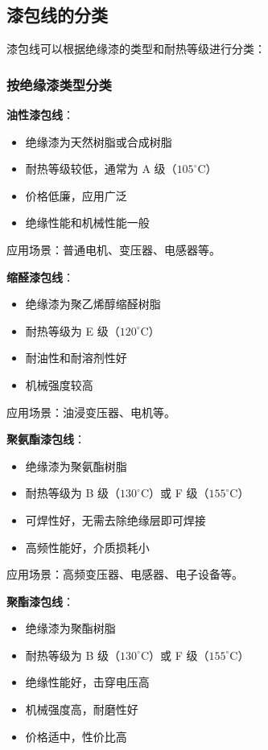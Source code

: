 \documentclass[12pt,UTF8]{ctexbook}
\begin{document}
\subsection{漆包线的分类}

漆包线可以根据绝缘漆的类型和耐热等级进行分类：

\subsubsection{按绝缘漆类型分类}

\textbf{油性漆包线}：
\begin{itemize}[leftmargin=3.5em]
    \item 绝缘漆为天然树脂或合成树脂
    \item 耐热等级较低，通常为 A 级（$105^\circ$C）
    \item 价格低廉，应用广泛
    \item 绝缘性能和机械性能一般
\end{itemize}

应用场景：普通电机、变压器、电感器等。

\textbf{缩醛漆包线}：
\begin{itemize}[leftmargin=3.5em]
    \item 绝缘漆为聚乙烯醇缩醛树脂
    \item 耐热等级为 E 级（$120^\circ$C）
    \item 耐油性和耐溶剂性好
    \item 机械强度较高
\end{itemize}

应用场景：油浸变压器、电机等。

\textbf{聚氨酯漆包线}：
\begin{itemize}[leftmargin=3.5em]
    \item 绝缘漆为聚氨酯树脂
    \item 耐热等级为 B 级（$130^\circ$C）或 F 级（$155^\circ$C）
    \item 可焊性好，无需去除绝缘层即可焊接
    \item 高频性能好，介质损耗小
\end{itemize}

应用场景：高频变压器、电感器、电子设备等。

\textbf{聚酯漆包线}：
\begin{itemize}[leftmargin=3.5em]
    \item 绝缘漆为聚酯树脂
    \item 耐热等级为 B 级（$130^\circ$C）或 F 级（$155^\circ$C）
    \item 绝缘性能好，击穿电压高
    \item 机械强度高，耐磨性好
    \item 价格适中，性价比高
\end{itemize}
\end{document}

